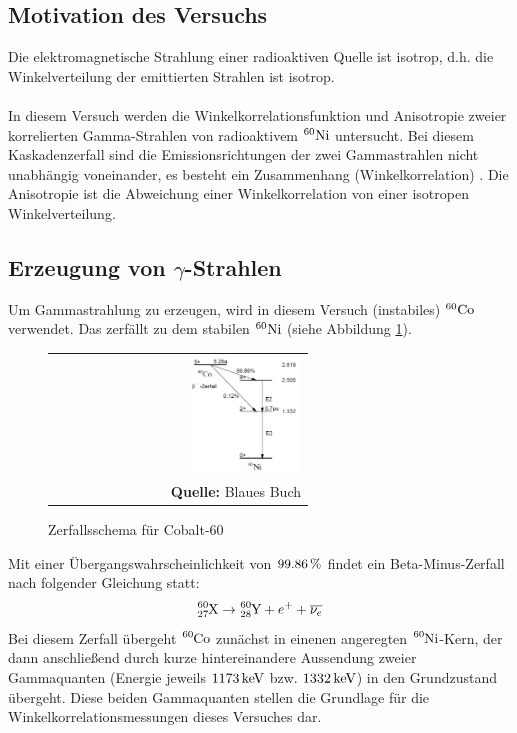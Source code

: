 \documentclass[a4paper,titlepage]{scrartcl}
\numberwithin{equation}{section}
\begin{document}
\subsection{Motivation des Versuchs}
Die elektromagnetische Strahlung einer radioaktiven Quelle ist isotrop, d.h. die Winkelverteilung der emittierten Strahlen ist isotrop.\\ \\
In diesem Versuch werden die Winkelkorrelationsfunktion und Anisotropie zweier korrelierten Gamma-Strahlen von radioaktivem $^{60}\ce{Ni}$ untersucht. Bei diesem Kaskadenzerfall sind die Emissionsrichtungen der zwei Gammastrahlen nicht unabhängig voneinander, es besteht ein Zusammenhang (Winkelkorrelation) \cite{web:korrelation}. Die Anisotropie ist die Abweichung einer Winkelkorrelation von einer isotropen Winkelverteilung.
\subsection{Erzeugung von $\gamma$-Strahlen}
Um Gammastrahlung zu erzeugen, wird in diesem Versuch (instabiles) $^{60}\ce{Co}$ verwendet. Das zerfällt zu dem stabilen $^{60}\ce{Ni}$ (siehe Abbildung \ref{fig:cobalt}).
\begin{figure}[H]
	\centering
	\begin{tabular}{@{}r@{}}
		\includegraphics[width=0.45\textwidth]{images/cobalt.PNG}\\
		\footnotesize\sffamily\textbf{Quelle:} Blaues Buch \cite{blauesBuch}
	\end{tabular}
	\caption{Zerfallsschema für Cobalt-60}
    \label{fig:cobalt}
\end{figure}
Mit einer Übergangswahrscheinlichkeit von $\unit[99.86]{\%}$ findet ein Beta-Minus-Zerfall nach folgender Gleichung statt:
\begin{equation*}
\ce{^{60}_{27}X} \rightarrow \ce{^{60}_{28}Y} + e^{+}+ \overline{\nu_e}
\end{equation*}
Bei diesem Zerfall übergeht $\ce{^{60}Co}$ zunächst in einenen angeregten $\ce{^{60}Ni}$-Kern, der dann anschließend durch kurze hintereinandere Aussendung zweier Gammaquanten (Energie jeweils $\unit[1173]{keV}$ bzw. $\unit[1332]{keV}$) in den Grundzustand übergeht. Diese beiden Gammaquanten stellen die Grundlage für die Winkelkorrelationsmessungen dieses Versuches dar.
\end{document}
